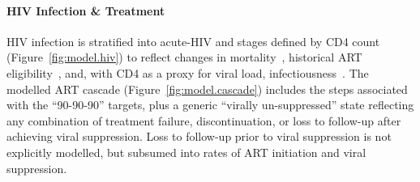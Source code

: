\paragraph{HIV Infection \& Treatment}
HIV infection is stratified into
acute-HIV and stages defined by CD4 count (Figure~\ref{fig:model.hiv})
to reflect changes in mortality~\cite{Mangal2017},
historical ART eligibility~\cite{EswMOH2006gui,EswMOH2010gui,EswMOH2015gui,EswMOH2018gui},
and, with CD4 as a proxy for viral load, infectiousness~\cite{Boily2009}.
The modelled ART cascade (Figure~\ref{fig:model.cascade})
includes the steps associated with the ``90-90-90'' targets,
plus a generic ``virally un-suppressed'' state reflecting any combination of
treatment failure, discontinuation, or loss to follow-up after achieving viral suppression.
Loss to follow-up prior to viral suppression is not explicitly modelled,
but subsumed into rates of ART initiation and viral suppression.
